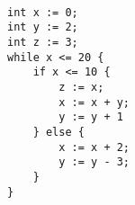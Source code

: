     \begin{lstlisting}[]  % Start your code-block

int x := 0;
int y := 2;
int z := 3;
while x <= 20 {
    if x <= 10 {
        z := x;
        x := x + y;
        y := y + 1
    } else {
        x := x + 2;
        y := y - 3;
    }
}
	\end{lstlisting}